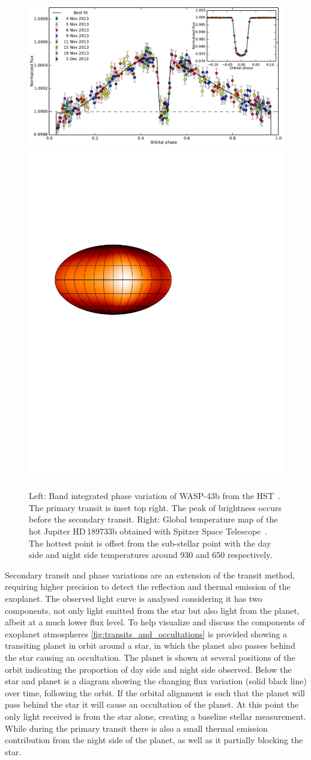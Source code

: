 \begin{figure}
    \centering
    \includegraphics[width=0.5\linewidth]{figures/introduction/stevenson_phasecurve2014.pdf}
    \includegraphics[width=0.4\linewidth]{figures/introduction/knutson_2007_temperature_map_HD_189733b.pdf}
    \caption[Exoplanet phase variations and temperature map.]{Left: Band integrated phase variation of {WASP-43b} from the HST~\citep{stevenson_thermal_2014}.
    The primary transit is inset top right.
    The peak of brightness occurs before the secondary transit.
    Right: Global temperature map of the hot Jupiter HD\,189733b obtained with {Spitzer Space Telescope}~\citep{knutson_map_2007}.
    The hottest point is offset from the sub-stellar point with the day side and night side temperatures around 930\K{} and 650\K{} respectively.}
    \label{fig:phasecurve2014_and_temp_map}
\end{figure}

Secondary transit and phase variations are an extension of the transit method, requiring higher precision to detect the reflection and thermal emission of the exoplanet.
The observed light curve is analysed considering it has two components, not only light emitted from the star but also light from the planet, albeit at a much lower flux level.
To help visualize and discuss the components of exoplanet atmospheres \cref{fig:transits_and_occultations} is provided showing a transiting planet in orbit around a star, in which the planet also passes behind the star causing an occultation.
The planet is shown at several positions of the orbit indicating the proportion of day side and night side observed.
Below the star and planet is a diagram showing the changing flux variation (solid black line) over time, following the orbit.
If the orbital alignment is such that the planet will pass behind the star it will cause an occultation of the planet.
At this point the only light received is from the star alone, creating a baseline stellar measurement.
While during the primary transit there is also a small thermal emission contribution from the night side of the planet, as well as it partially blocking the star.

